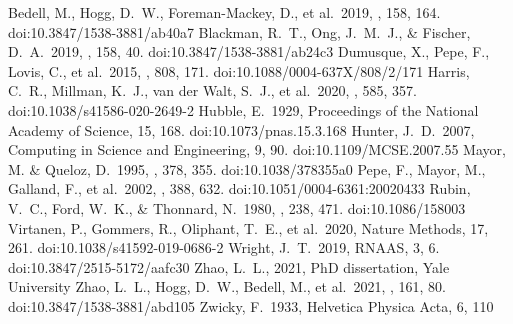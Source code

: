 \documentclass[modern]{aastex631}
\begin{document}
\begin{thebibliography}{dummy}
   Bedell, M., Hogg, D.~W., Foreman-Mackey, D., et al.\ 2019, \aj, 158, 164. doi:10.3847/1538-3881/ab40a7
   Blackman, R.~T., Ong, J.~M.~J., \& Fischer, D.~A.\ 2019, \aj, 158, 40. doi:10.3847/1538-3881/ab24c3
   Dumusque, X., Pepe, F., Lovis, C., et al.\ 2015, \apj, 808, 171. doi:10.1088/0004-637X/808/2/171
   Harris, C.~R., Millman, K.~J., van der Walt, S.~J., et al.\ 2020, \nat, 585, 357. doi:10.1038/s41586-020-2649-2
   Hubble, E.\ 1929, Proceedings of the National Academy of Science, 15, 168. doi:10.1073/pnas.15.3.168
   Hunter, J.~D.\ 2007, Computing in Science and Engineering, 9, 90. doi:10.1109/MCSE.2007.55
   Mayor, M. \& Queloz, D.\ 1995, \nat, 378, 355. doi:10.1038/378355a0
   Pepe, F., Mayor, M., Galland, F., et al.\ 2002, \aap, 388, 632. doi:10.1051/0004-6361:20020433
   Rubin, V.~C., Ford, W.~K., \& Thonnard, N.\ 1980, \apj, 238, 471. doi:10.1086/158003
   Virtanen, P., Gommers, R., Oliphant, T.~E., et al.\ 2020, Nature Methods, 17, 261. doi:10.1038/s41592-019-0686-2
   Wright, J.~T.\ 2019, RNAAS, 3, 6. doi:10.3847/2515-5172/aafc30
   Zhao, L.~L., 2021, PhD dissertation, Yale University
   Zhao, L.~L., Hogg, D.~W., Bedell, M., et al.\ 2021, \aj, 161, 80. doi:10.3847/1538-3881/abd105
   Zwicky, F.\ 1933, Helvetica Physica Acta, 6, 110
\end{thebibliography}
\end{document}
